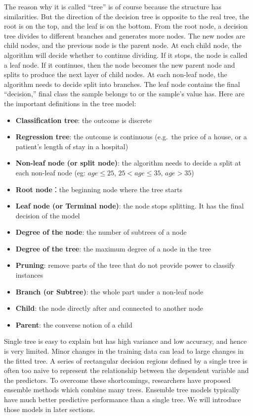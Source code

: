\documentclass[12pt,]{krantz}
\providecommand{\tightlist}{%
  \setlength{\itemsep}{0pt}\setlength{\parskip}{0pt}}
\begin{document}
The reason why it is called ``tree'' is of course because the structure has similarities. But the direction of the decision tree is opposite to the real tree, the root is on the top, and the leaf is on the bottom. From the root node, a decision tree divides to different branches and generates more nodes. The new nodes are child nodes, and the previous node is the parent node. At each child node, the algorithm will decide whether to continue dividing. If it stops, the node is called a leaf node. If it continues, then the node becomes the new parent node and splits to produce the next layer of child nodes. At each non-leaf node, the algorithm needs to decide split into branches. The leaf node contains the final ``decision,'' final class the sample belongs to or the sample's value has. Here are the important definitions in the tree model:

\begin{itemize}
\tightlist
\item
  \textbf{Classification tree}: the outcome is discrete
\item
  \textbf{Regression tree}: the outcome is continuous (e.g.~the price of a house, or a patient's length of stay in a hospital)
\item
  \textbf{Non-leaf node (or split node)}: the algorithm needs to decide a split at each non-leaf node (eg: \(age \leq 25\), \(25 < age \leq 35\), \(age > 35\))
\item
  \textbf{Root node}：the beginning node where the tree starts
\item
  \textbf{Leaf node (or Terminal node)}: the node stops splitting. It has the final decision of the model
\item
  \textbf{Degree of the node}: the number of subtrees of a node
\item
  \textbf{Degree of the tree}: the maximum degree of a node in the tree
\item
  \textbf{Pruning}: remove parts of the tree that do not provide power to classify instances
\item
  \textbf{Branch (or Subtree)}: the whole part under a non-leaf node
\item
  \textbf{Child}: the node directly after and connected to another node
\item
  \textbf{Parent}: the converse notion of a child
\end{itemize}

Single tree is easy to explain but has high variance and low accuracy, and hence is very limited. Minor changes in the training data can lead to large changes in the fitted tree. A series of rectangular decision regions defined by a single tree is often too naive to represent the relationship between the dependent variable and the predictors. To overcome these shortcomings, researchers have proposed ensemble methods which combine many trees. Ensemble tree models typically have much better predictive performance than a single tree. We will introduce those models in later sections.
\end{document}
